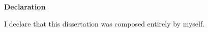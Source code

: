 \begin{center}
\textrm{\bfseries\Huge Declaration}%
\end{center}%
\vspace{1em}

I declare that this dissertation was composed entirely by myself.
\lipsum[1]
%
%
%
%
%
%
\vspace*{\fill}
\newpage
%
%
